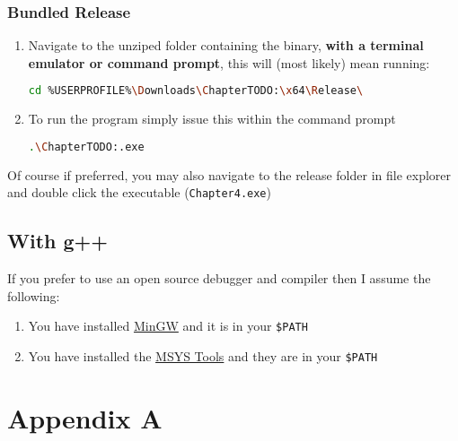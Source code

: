 \documentclass[a4paper,11pt]{article}
\begin{document}
      \subsubsection{Bundled Release}
        \begin{enumerate}
          \item Navigate to the unziped folder containing the binary, 
            \textbf{with a terminal emulator or command prompt}, this will
            (most likely) mean running:
            \begin{lstlisting}[language=bash]
              cd %USERPROFILE%\Downloads\ChapterTODO:\x64\Release\
            \end{lstlisting}
          \item To run the program simply issue this within the command
            prompt
            \begin{lstlisting}[language=bash]
              .\ChapterTODO:.exe
            \end{lstlisting}
        \end{enumerate}
        Of course if preferred, you may also navigate to the release folder in
          file explorer and double click the executable (\texttt{Chapter4.exe})
      \subsection{With g++}
        If you prefer to use an open source debugger and compiler then I assume
          the following:
          \begin{enumerate}
            \item You have installed \href{http://www.mingw.org/}{MinGW} and
              it is in your \texttt{\$PATH}
            \item You have installed the
            \href{http://www.mingw.org/wiki/MSYS}{MSYS Tools} and they are in
              your \texttt{\$PATH}
          \end{enumerate}


  \newpage
  \appendix

  \section{Appendix A}
\end{document}
